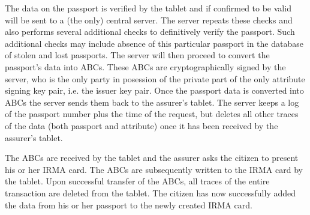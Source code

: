 The data on the passport is verified by the tablet and if confirmed to be valid will be sent to a (the only) central server. The server repeats these checks and also performs several additional checks to definitively verify the passport. Such additional checks may include absence of this particular passport in the database of stolen and lost passports. The server will then proceed to convert the passport's data into ABCs. These ABCs are cryptographically signed by the server, who is the only party in posession of the private part of the only attribute signing key pair, i.e. the issuer key pair. Once the passport data is converted into ABCs the server sends them back to the assurer's tablet. The server keeps a log of the passport number plus the time of the request, but deletes all other traces of the data (both passport and attribute) once it has been received by the assurer's tablet. 

The ABCs are received by the tablet and the assurer asks the citizen to present his or her IRMA card. The ABCs are subsequently written to the IRMA card by the tablet. Upon successful transfer of the ABCs, all traces of the entire transaction are deleted from the tablet. The citizen has now successfully added the data from his or her passport to the newly created IRMA card.
